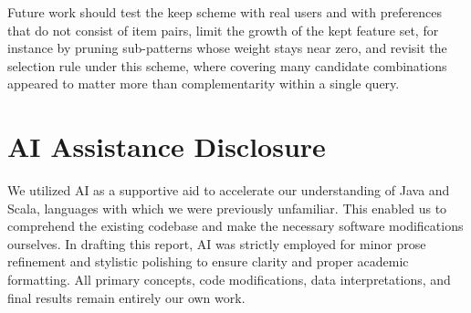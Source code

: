 \documentclass[sigconf]{acmart}
\begin{document}
Future work should test the keep scheme with real users and with preferences that do not consist of item pairs, limit the growth of the kept feature set, for instance by pruning sub-patterns whose weight stays near zero, and revisit the selection rule under this scheme, where covering many candidate combinations appeared to matter more than complementarity within a single query.





\newpage
\appendix

\section{AI Assistance Disclosure}
We utilized AI as a supportive aid to accelerate our understanding of Java and Scala, languages with which we were previously unfamiliar. This enabled us to comprehend the existing codebase and make the necessary software modifications ourselves. In drafting this report, AI was strictly employed for minor prose refinement and stylistic polishing to ensure clarity and proper academic formatting. All primary concepts, code modifications, data interpretations, and final results remain entirely our own work.
\end{document}
